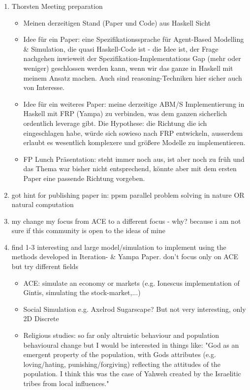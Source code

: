 \begin{enumerate}
\item Thorsten Meeting preparation
	\begin{itemize}
		\item Meinen derzeitigen Stand (Paper und Code) aus Haskell Sicht
		\item Idee für ein Paper: eine Spezifikationssprache für Agent-Based Modelling \& Simulation, die quasi Haskell-Code ist - die Idee ist, der Frage nachgehen inwieweit der Spezifikation-Implementations Gap (mehr oder weniger) geschlossen werden kann, wenn wir das ganze in Haskell mit meinem Ansatz machen. Auch sind reasoning-Techniken hier sicher auch von Interesse.
		\item Idee für ein weiteres Paper: meine derzeitige ABM/S Implementierung in Haskell mit FRP (Yampa) zu verbinden, was dem ganzen sicherlich ordentlich leverage gibt. Die Hypothese: die Richtung die ich eingeschlagen habe, würde sich sowieso nach FRP entwickeln, ausserdem erlaubt es wesentlich komplexere und größere Modelle zu implementieren.
		\item FP Lunch Präsentation: steht immer noch aus, ist aber noch zu früh und das Thema war bisher nicht entsprechend, könnte aber mit dem ersten Paper eine passende Richtung vorgeben.
	\end{itemize}

\item got hint for publishing paper in: ppsm parallel problem solving in nature OR natural computation
	
\item my change my focus from ACE to a different focus - why? because i am not sure if this community is open to the ideas of mine
\item find 1-3 interesting and large model/simulation to implement using the methods developed in Iteration- \& Yampa Paper. don't focus only on ACE but try different fields
	\begin{itemize}
		\item ACE: simulate an economy or markets (e.g. Ionescus implementation of Gintis, simulating the stock-market,...)
		\item Social Simulation e.g. Axelrod Sugarscape? But not very interesting, only 2D Discrete 
		\item Religious studies: so far only altruistic behaviour and population behavioural change but I would be interested in things like: "God as an emergent property of the population, with Gods attributes (e.g. loving/hating, punishing/forgiving) reflecting the attitudes of the population. I think this was the case of Yahweh created by the Israelitic tribes from local influences."
	\end{itemize}

\end{enumerate} 

